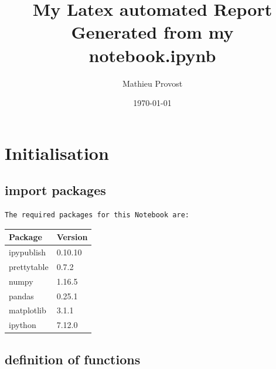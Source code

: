 \documentclass[reprint, floatfix, groupaddress, prb]{article}
\title{\huge{\textbf{My Latex automated Report}}\\[2ex]  \LARGE{Generated from my notebook.ipynb}}
\author{Mathieu Provost}
\date{\today}
\begin{document}
    
    
    
\maketitle
\thispagestyle{empty}
\newpage

\tableofcontents
\thispagestyle{empty}
\newpage

\listoffigures
\thispagestyle{empty}
\newpage

\listoftables
\thispagestyle{empty}
\newpage


    
    

    
    \hypertarget{initialisation}{%
\section{Initialisation}\label{initialisation}}

    \hypertarget{import-packages}{%
\subsection{import packages}\label{import-packages}}

    \begin{Verbatim}[commandchars=\\\{\}]
The required packages for this Notebook are:

    \end{Verbatim}

    
        
    \begin{table}[ht] 
\begin{tabular}[l]{ll}
\toprule
Package & Version\\ 
\midrule
ipypublish & 0.10.10\\ 
prettytable & 0.7.2\\ 
numpy & 1.16.5\\ 
pandas & 0.25.1\\ 
matplotlib & 3.1.1\\ 
ipython & 7.12.0\\ 
\bottomrule 
 \end{tabular}
\end{table}

    
    

    \hypertarget{definition-of-functions}{%
\subsection{definition of functions}\label{definition-of-functions}}
\end{document}
